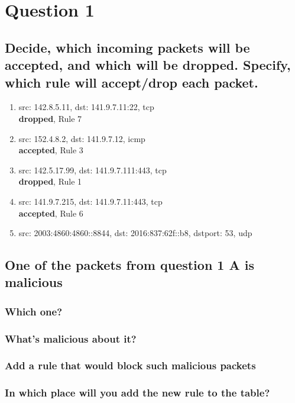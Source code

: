 \documentclass{report}
\begin{document}
	\section{Question 1}
	\startsection
		\renewcommand{\thesubsection}{\thesection.\Alph{subsection}}
		\subsection{Decide, which incoming packets will be accepted, and which will be dropped. Specify, which rule will accept/drop each packet.}
		\begin{enumerate}[-]
			\item src: 142.8.5.11, dst: 141.9.7.11:22, tcp \\ \textbf{dropped}, Rule 7
			\item src: 152.4.8.2, dst: 141.9.7.12, icmp \\ \textbf{accepted}, Rule 3
			\item src: 142.5.17.99, dst: 141.9.7.111:443, tcp \\ \textbf{dropped}, Rule 1
			\item src: 141.9.7.215, dst: 141.9.7.11:443, tcp \\ \textbf{accepted}, Rule 6
			\item src: 2003:4860:4860::8844, dst: 2016:837:62f::b8, dstport: 53, udp
		\end{enumerate}
		\subsection{One of the packets from question 1 A is malicious}
		\startsubsection
			\subsubsection{Which one?}
			\startsubsection
			\closesection
			\subsubsection{What’s malicious about it?}
			\startsubsection
			\closesection
			\subsubsection{Add a rule that would block such malicious packets}
			\startsubsection
			\closesection
			\subsubsection{In which place will you add the new rule to the table?}
			\startsubsection
			\closesection
		\closesection
	\closesection
\end{document}

